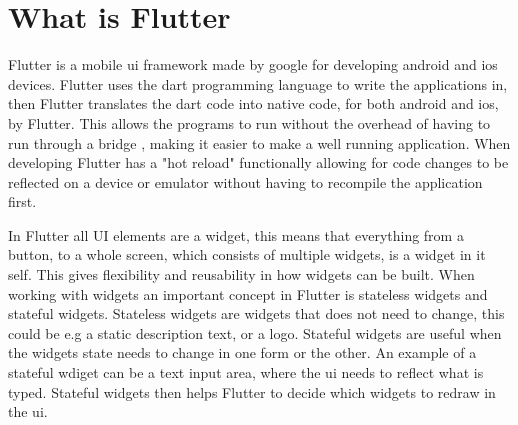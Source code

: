 \section{What is Flutter}


Flutter is a mobile \gls{ui} framework made by google for developing android and ios devices. Flutter uses the dart programming language to write the applications in, then Flutter translates the dart code into native code, for both android and ios, by Flutter. This allows the programs to run without the overhead of having to run through a bridge , making it easier to make a well running application. 
When developing Flutter has a "hot reload" functionally allowing for code changes to be reflected on a device or emulator without having to recompile the application first.

In Flutter all UI elements are a widget, this means that everything from a  button, to a  whole screen, which consists of multiple widgets, is a widget in it self. This gives flexibility and reusability in how widgets can be built. When working with widgets an important concept in Flutter is stateless widgets and stateful widgets. Stateless widgets are widgets that does not need to change, this could be  e.g a static description text, or a logo. Stateful widgets are useful when the widgets state needs to change in one form or the other.  An example of a stateful wdiget can be a text input area, where the \gls{ui} needs to reflect what is typed. Stateful widgets then helps Flutter to decide which widgets to redraw in the \gls{ui}.


